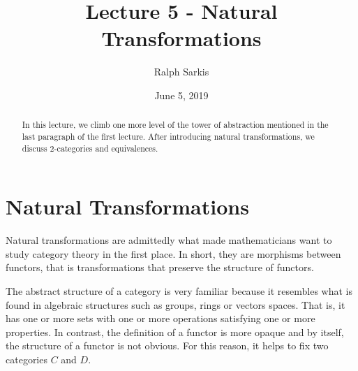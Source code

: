 \documentclass{article}
\title{Lecture 5 - Natural Transformations\vspace{-10pt}}
\author{Ralph Sarkis}
\date{\vspace{-10pt}June 5, 2019\vspace{-15pt}}  %
\theoremstyle{definition}
\theoremstyle{remark}
\begin{document}
\maketitle
\begin{abstract} In this lecture, we climb one more level of the tower of abstraction mentioned in the last paragraph of the first lecture. After introducing natural transformations, we discuss 2-categories and equivalences.
\end{abstract}
\section{Natural Transformations}
Natural transformations are admittedly what made mathematicians want to study category theory in the first place. In short, they are morphisms between functors, that is transformations that preserve the structure of functors.

The abstract structure of a category is very familiar because it resembles what is found in algebraic structures such as groups, rings or vectors spaces. That is, it has one or more sets with one or more operations satisfying one or more properties. In contrast, the definition of a functor is more opaque and by itself, the structure of a functor is not obvious. For this reason, it helps to fix two categories $C$ and $D$. 
\end{document}
